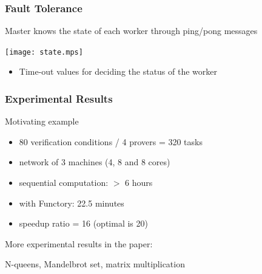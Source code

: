 \documentclass[xcolor=dvipsnames]{beamer}
\let\emph\alert
\begin{document}


\begin{frame}\frametitle {Fault Tolerance}

Master knows the state of each worker through ping/pong messages

  \begin{center}
    \texttt{[image: state.mps]}
  \end{center}

  \begin{itemize}
  \item Time-out values for deciding the status of the worker
  \end{itemize}
  
\end{frame}



\begin{frame}\frametitle {Experimental Results}
  Motivating example
  \begin{itemize}
  \item 80 verification conditions / 4 provers = 320 tasks
  \item network of 3 machines (4, 8 and 8 cores)
  \end{itemize}

  \begin{itemize}
  \item sequential computation: \emph{$>$ 6 hours}
  \item with Functory: \emph{22.5 minutes}
  \item speedup ratio = \emph{16} (optimal is 20)
  \end{itemize}


\bigskip
  More experimental results in the paper: \par N-queens, Mandelbrot set,
  matrix multiplication
\end{frame}

\end{document}
